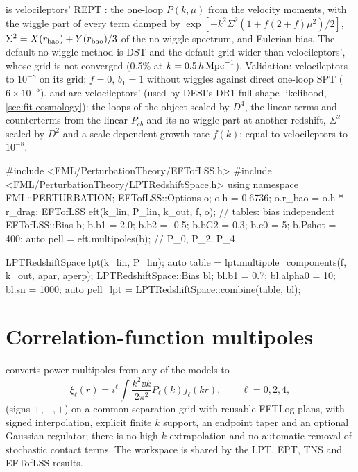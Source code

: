  is velocileptors' REPT \cite{Chen2020}: the one-loop $P(k,\mu)$ from the velocity moments, with
the wiggle part of every term damped by $\exp[-k^2\Sigma^2(1+f(2+f)\mu^2)/2]$, $\Sigma^2=X(r_{\rm bao})+Y(r_{\rm bao})/3$ of
the no-wiggle spectrum, and Eulerian bias. The default no-wiggle method is DST and the default grid wider than
velocileptors', whose grid is not converged (0.5\% at $k=0.5\,h\,\mathrm{Mpc}^{-1}$). Validation: velocileptors to $10^{-8}$ on its grid;
$f=0$, $b_1=1$ without wiggles against direct one-loop SPT ($6\times10^{-5}$).  and
 are velocileptors'  (used by DESI's DR1 full-shape
likelihood, \cref{sec:fit-cosmology}): the loops of the object scaled by $D^4$, the linear terms and counterterms from the
linear $P_{cb}$ and its no-wiggle part at another redshift, $\Sigma^2$ scaled by $D^2$ and a scale-dependent growth rate
$f(k)$; equal to velocileptors to $10^{-8}$.

\begin{cppcode}
#include <FML/PerturbationTheory/EFTofLSS.h>
#include <FML/PerturbationTheory/LPTRedshiftSpace.h>
using namespace FML::PERTURBATION;
EFTofLSS::Options o;  o.h = 0.6736;  o.r_bao = o.h * r_drag;
EFTofLSS eft(k_lin, P_lin, k_out, f, o);             // tables: bias independent
EFTofLSS::Bias b;  b.b1 = 2.0;  b.b2 = -0.5;  b.bG2 = 0.3;  b.c0 = 5;  b.Pshot = 400;
auto pell = eft.multipoles(b);                       // P_0, P_2, P_4

LPTRedshiftSpace lpt(k_lin, P_lin);
auto table = lpt.multipole_components(f, k_out, apar, aperp);
LPTRedshiftSpace::Bias bl;  bl.b1 = 0.7;  bl.alpha0 = 10;  bl.sn = 1000;
auto pell_lpt = LPTRedshiftSpace::combine(table, bl);
\end{cppcode}

\section{Correlation-function multipoles}\label{sec:pt-xi}

 converts power multipoles from any of the models to
\begin{equation}
\xi_\ell(r)=i^\ell\int\frac{k^2\dd k}{2\pi^2}P_\ell(k)j_\ell(kr),\qquad \ell=0,2,4,
\end{equation}
(signs $+,-,+$) on a common separation grid with reusable FFTLog plans, with signed interpolation, explicit finite $k$
support, an endpoint taper and an optional Gaussian regulator; there is no high-$k$ extrapolation and no automatic removal
of stochastic contact terms. The workspace is shared by the LPT, EPT, TNS and EFTofLSS results.
